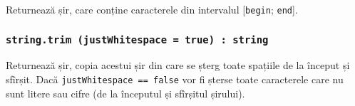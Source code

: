 Returnează șir, care conține caracterele din intervalul [\texttt{begin}; \texttt{end}].

\subsubsection{\texttt{string.trim (justWhitespace = true) : string}}

Returnează șir, copia acestui șir din care se șterg toate spațiile de la început și sfîrșit. Dacă \texttt{justWhitespace == false} vor fi șterse toate caracterele care nu sunt litere sau cifre (de la începutul și sfîrșitul șirului).


